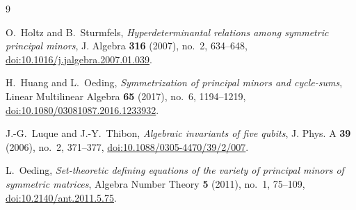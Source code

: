 \documentclass[11pt]{amsart}
\theoremstyle{remark}
\begin{document}
\begin{thebibliography}{9}

O.~Holtz and B.~Sturmfels,
\emph{Hyperdeterminantal relations among symmetric principal minors},
J. Algebra \textbf{316} (2007), no.~2, 634--648,
\href{https://doi.org/10.1016/j.jalgebra.2007.01.039}
{doi:10.1016/j.jalgebra.2007.01.039}.

H.~Huang and L.~Oeding,
\emph{Symmetrization of principal minors and cycle-sums},
Linear Multilinear Algebra \textbf{65} (2017), no.~6, 1194--1219,
\href{https://doi.org/10.1080/03081087.2016.1233932}
{doi:10.1080/03081087.2016.1233932}.

J.-G.~Luque and J.-Y.~Thibon,
\emph{Algebraic invariants of five qubits},
J. Phys. A \textbf{39} (2006), no.~2, 371--377,
\href{https://doi.org/10.1088/0305-4470/39/2/007}
{doi:10.1088/0305-4470/39/2/007}.

L.~Oeding,
\emph{Set-theoretic defining equations of the variety of principal
minors of symmetric matrices},
Algebra Number Theory \textbf{5} (2011), no.~1, 75--109,
\href{https://doi.org/10.2140/ant.2011.5.75}
{doi:10.2140/ant.2011.5.75}.

\end{thebibliography}
\end{document}
